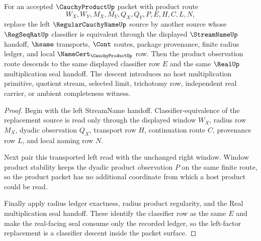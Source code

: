 \begin{theorem}
\label{thm:cauchy-product-left-factor-classifier-congruence}
For an accepted $\CauchyProductUp$ packet with product route
$$
W_X,W_Y,M_X,M_Y,Q_X,Q_Y,P,E,H,C,L,N,
$$
replace the left $\RegularCauchyNameUp$ source by another source whose $\RegSeqRatUp$ classifier is equivalent through the displayed $\StreamNameUp$ handoff, $\hsame$ transports, $\Cont$ routes, package provenance, finite radius ledger, and local $\NameCert_{\CauchyProductUp}$ row. Then the product observation route descends to the same displayed classifier row $E$ and the same $\RealUp$ multiplication seal handoff. The descent introduces no host multiplication primitive, quotient stream, selected limit, trichotomy row, independent real carrier, or ambient completeness witness.
\end{theorem}
\begin{proof}
Begin with the left StreamName handoff. Classifier-equivalence of the replacement source is read only through the displayed window $W_X$, radius row $M_X$, dyadic observation $Q_X$, transport row $H$, continuation route $C$, provenance row $L$, and local naming row $N$.

Next pair this transported left read with the unchanged right window. Window product stability keeps the dyadic product observation $P$ on the same finite route, so the product packet has no additional coordinate from which a host product could be read.

Finally apply radius ledger exactness, radius product regularity, and the Real multiplication seal handoff. These identify the classifier row as the same $E$ and make the real-facing seal consume only the recorded ledger, so the left-factor replacement is a classifier descent inside the packet surface.
\end{proof}

